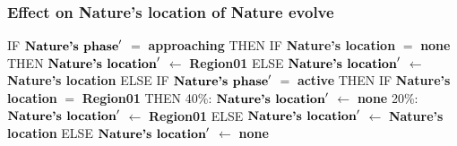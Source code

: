 \documentclass{article}%
\begin{document}
\subsubsection{Effect on Nature's location of Nature evolve}%
\label{ssubsec:Effect on Nature's location of Nature evolve}%
\begin{flushleft}%
IF %
$\mbox{\textbf{Nature's phase}} '$%
$=$%
\textbf{approaching}%
\linebreak%
\hspace*{2em}%
THEN %
IF %
\textbf{Nature's location}%
$=$%
\textbf{none}%
\linebreak%
\hspace*{4em}%
THEN %
$\mbox{\textbf{Nature's location}} '$%
$\leftarrow$%
\textbf{Region01}%
\linebreak%
\hspace*{4em}%
ELSE %
$\mbox{\textbf{Nature's location}} '$%
$\leftarrow$%
\textbf{Nature's location}%
\linebreak%
\hspace*{2em}%
ELSE %
IF %
$\mbox{\textbf{Nature's phase}} '$%
$=$%
\textbf{active}%
\linebreak%
\hspace*{4em}%
THEN %
IF %
\textbf{Nature's location}%
$=$%
\textbf{Region01}%
\linebreak%
\hspace*{6em}%
THEN %
\linebreak%
\hspace*{8em}%
40\%: %
$\mbox{\textbf{Nature's location}} '$%
$\leftarrow$%
\textbf{none}%
\linebreak%
\hspace*{8em}%
20\%: %
$\mbox{\textbf{Nature's location}} '$%
$\leftarrow$%
\textbf{Region01}%
\linebreak%
\hspace*{6em}%
ELSE %
$\mbox{\textbf{Nature's location}} '$%
$\leftarrow$%
\textbf{Nature's location}%
\linebreak%
\hspace*{4em}%
ELSE %
$\mbox{\textbf{Nature's location}} '$%
$\leftarrow$%
\textbf{none}%
\end{flushleft}

%
\end{document}
